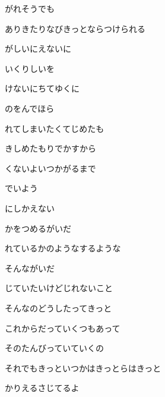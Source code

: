 \documentclass[a4paper,tate,twocolumn,12pt]{ltjtarticle}
\begin{document}
\begin{flushleft}
\begin{minipage}{\linewidth}
がれそうでも

ありきたりなびきっとならつけられる
\end{minipage}

\vspace{2em}

\noindent\begin{minipage}{\linewidth}
がしいにえないに

いくりしいを

けないにちてゆくに

のをんでほら

れてしまいたくてじめたも

きしめたもりでかすから

くないよいつかがるまで

でいよう
\end{minipage}

\vspace{2em}

\noindent\begin{minipage}{\linewidth}
にしかえない

かをつめるがいだ

れているかのようなするような

そんながいだ
\end{minipage}

\vspace{2em}

\noindent\begin{minipage}{\linewidth}
じていたいけどじれないこと

そんなのどうしたってきっと

これからだっていくつもあって

そのたんびっていていくの

それでもきっといつかはきっとらはきっと

かりえるさじてるよ
\end{minipage}


\end{flushleft}
\end{document}
